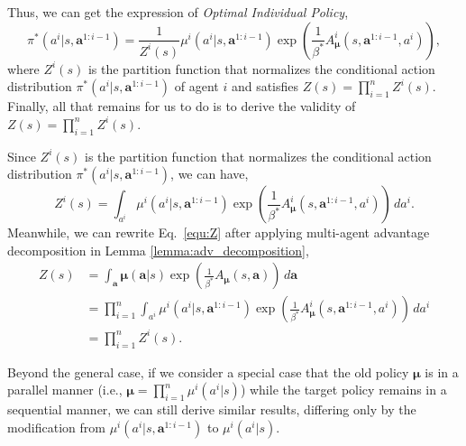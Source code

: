 \documentclass[11pt]{article}
\theoremstyle{plain}
\theoremstyle{remark}
\begin{document}
Thus, we can get the expression of \emph{Optimal Individual Policy},
\begin{equation}
    \pi^{*}(a^{i}|s, \boldsymbol{a}^{1:i-1}) = \frac{1}{Z^{i}(s)} \mu^{i}(a^{i}|s, \boldsymbol{a}^{1:i-1}) \exp \left( \frac{1}{\beta^{*}}A_{\boldsymbol{\mu}}^{i}(s, \boldsymbol{a}^{1:i-1}, a^i) \right),
\end{equation}
where $Z^{i}(s)$ is the partition function that normalizes the conditional action distribution $\pi^{*}(a^{i}|s, \boldsymbol{a}^{1:i-1})$ of agent $i$ and satisfies $Z(s) = \prod_{i=1}^{n}Z^{i}(s)$. Finally, all that remains for us to do is to derive the validity of $Z(s) = \prod_{i=1}^{n}Z^{i}(s)$. 

Since $Z^{i}(s)$ is the partition function that normalizes the conditional action distribution $\pi^{*}(a^{i}|s, \boldsymbol{a}^{1:i-1})$, we can have,
\begin{equation}
    Z^{i}(s) = \int_{a^i} \mu^{i}(a^{i}|s, \boldsymbol{a}^{1:i-1})\exp \left( \frac{1}{\beta^{*}}A_{\boldsymbol{\mu}}^{i}(s, \boldsymbol{a}^{1:i-1}, a^i) \right) \,da^i.
\end{equation}
Meanwhile, we can rewrite Eq.~\eqref{equ:Z} after applying multi-agent advantage decomposition in Lemma \ref{lemma:adv_decomposition}, 
\begin{align}
    Z(s) &= \int_{\boldsymbol{a}}\boldsymbol{\mu}(\boldsymbol{a}|s) \exp \left( \frac{1}{\beta^{*}}A_{\boldsymbol{\mu}}(s, \boldsymbol{a}) \right)\,d\boldsymbol{a} \\
    &= \prod_{i=1}^{n}\int_{a^{i}} \mu^{i}(a^{i}|s, \boldsymbol{a}^{1:i-1})\exp \left( \frac{1}{\beta^{*}} A_{\boldsymbol{\mu}}^{i}(s, \boldsymbol{a}^{1:i-1}, a^i) \right)\,da^{i} \\
    &= \prod_{i=1}^{n} Z^{i}(s).
\end{align}

Beyond the general case, if we consider a special case that the old policy $\boldsymbol{\mu}$ is in a parallel manner (i.e., $\boldsymbol{\mu} = \prod_{i=1}^{n} \mu^{i}(a^{i}|s)$) while the target policy remains in a sequential manner, we can still derive similar results, differing only by the modification from $\mu^{i}(a^i|s, \boldsymbol{a}^{1:i-1})$ to $\mu^{i}(a^i|s)$.
\end{document}
